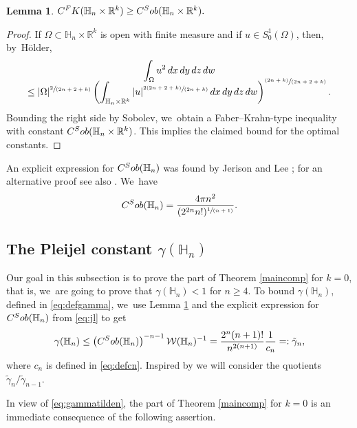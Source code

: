\documentclass[11pt]{article}
\let\oldsfrac\sfrac
\renewcommand{\sfrac}[2]{{\oldsfrac{#1}{#2}}}
\newcommand{\spfrac}[2]{{\sfrac{#1}{(#2)}}}
\newcommand{\pspfrac}[2]{{\sfrac{(#1)}{(#2)}}}
\newcommand{\FK}{\textup{FK}}
\newcommand{\Sob}{\textup{Sob}}
\newtheorem{lemma}[theorem]{Lemma}
\theoremstyle{definition}
\newcommand{\1}{\mathbbm{1}}
\newcommand{\R}{\mathbb{R}}
\numberwithin{equation}{section}
\begin{document}
\begin{lemma}\label{fksob}
$
C^\FK(\mathbb H_n\times\R^k) \geq C^\Sob(\mathbb H_n\times\R^k).
$
\end{lemma}

\begin{proof}
If $\Omega\subset\mathbb H_n\times\R^k$ is open with finite measure and if $u\in S^1_0(\Omega)$, then, by~Hölder,
\begin{multline*}
\int_\Omega u^2 \,dx\,dy\,dz\,dw\\[-8pt]
\leq |\Omega|^{\spfrac{2}{2n+2+k}} \left(\int_{\mathbb H_n\times\R^k} |u|^{\spfrac{2(2n+2+k)}{2n+k}}\,dx\,dy\,dz\,dw\right)^{\pspfrac{2n+k}{2n+2+k}}.
\end{multline*}
Bounding the right side by Sobolev, we~obtain a Faber--Krahn-type inequality with constant $C^\Sob(\mathbb H_n\times\R^k)$. This implies the claimed bound for the optimal constants.
\end{proof}

An explicit expression for $C^\Sob(\mathbb H_n)$ was found by Jerison and Lee \cite{JL}; for an alternative proof see also \cite{FrLi}. We~have
\begin{equation}\label{eq:jl}
C^\Sob(\mathbb H_n) = \frac{4\pi n^2}{(2^{2n} n!)^\spfrac{1}{n+1}}.
\end{equation}

\subsection{The Pleijel constant $\gamma(\mathbb H_n)$}\label{sec:maincompk0}
Our goal in this subsection is to prove the part of Theorem \ref{maincomp} for $k=0$, that is, we~are going to prove that $\gamma(\mathbb H_n)<1$ for $n\geq 4$. To bound $\gamma(\mathbb H_n)$, defined in \eqref{eq:defgamma}, we~use Lemma \ref{fksob} and the explicit expression for $C^\Sob(\mathbb H_n)$ from \eqref{eq:jl} to get
\begin{equation}
\label{eq:gammatilden}
\gamma(\mathbb H_n) \leq \left(C^\Sob(\mathbb H_n)\right)^{-n-1} \mathcal W(\mathbb H_n)^{-1} = \frac{2^n(n+1)!}{n^{2(n+1)}} \frac{1}{c_n} =: \tilde\gamma_n,
\end{equation}
where $c_n$ is defined in \eqref{eq:defcn}. Inspired by \cite{HPS} we will consider the quotients $\tilde\gamma_n/\tilde\gamma_{n-1}$.

In view of \eqref{eq:gammatilden}, the part of Theorem \ref{maincomp} for $k=0$ is an immediate consequence of the following assertion.
\end{document}

